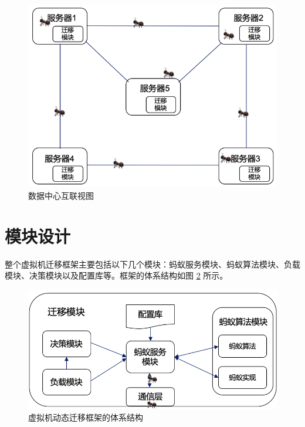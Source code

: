 \begin{figure}[htb]
  \centering
  \includegraphics{./Figure/IMG_Chap3_1.png}
  \caption{数据中心互联视图}\label{Fig:chap3_1}
\end{figure}

\section{模块设计}
整个虚拟机迁移框架主要包括以下几个模块：蚂蚁服务模块、蚂蚁算法模块、负载模块、决策模块以及配置库等。框架的体系结构如图 \ref{Fig:chap3_2} 所示。

\begin{figure}[htb]
  \centering
  \includegraphics{./Figure/IMG_Chap3_2.png}
  \caption{虚拟机动态迁移框架的体系结构}\label{Fig:chap3_2}
\end{figure}

